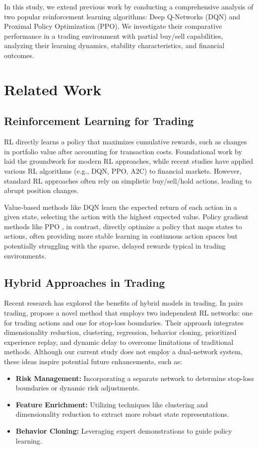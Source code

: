 \documentclass[11pt]{article}
\begin{document}
In this study, we extend previous work by conducting a comprehensive analysis of two popular reinforcement learning algorithms: Deep Q-Networks (DQN) and Proximal Policy Optimization (PPO). We investigate their comparative performance in a trading environment with partial buy/sell capabilities, analyzing their learning dynamics, stability characteristics, and financial outcomes.

\section{Related Work}

\subsection{Reinforcement Learning for Trading}
RL directly learns a policy that maximizes cumulative rewards, such as changes in portfolio value after accounting for transaction costs. Foundational work by \citet{sutton_2018_irl} laid the groundwork for modern RL approaches, while recent studies have applied various RL algorithms (e.g., DQN, PPO, A2C) to financial markets. However, standard RL approaches often rely on simplistic buy/sell/hold actions, leading to abrupt position changes.

Value-based methods like DQN \citep{mnih2015human} learn the expected return of each action in a given state, selecting the action with the highest expected value. Policy gradient methods like PPO \citep{schulman2017proximal}, in contrast, directly optimize a policy that maps states to actions, often providing more stable learning in continuous action spaces but potentially struggling with the sparse, delayed rewards typical in trading environments.

\subsection{Hybrid Approaches in Trading}
Recent research has explored the benefits of hybrid models in trading. In pairs trading, \citep{kim2022hybrid} propose a novel method that employs two independent RL networks: one for trading actions and one for stop-loss boundaries. Their approach integrates dimensionality reduction, clustering, regression, behavior cloning, prioritized experience replay, and dynamic delay to overcome limitations of traditional methods. Although our current study does not employ a dual-network system, these ideas inspire potential future enhancements, such as:
\begin{itemize}
  \item \textbf{Risk Management:} Incorporating a separate network to determine stop-loss boundaries or dynamic risk adjustments.
  \item \textbf{Feature Enrichment:} Utilizing techniques like clustering and dimensionality reduction to extract more robust state representations.
  \item \textbf{Behavior Cloning:} Leveraging expert demonstrations to guide policy learning.
\end{itemize}
\end{document}
